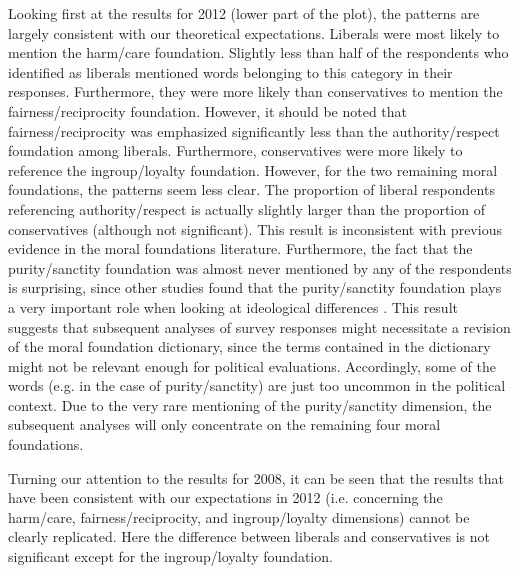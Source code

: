 \documentclass[12pt]{article}
\begin{document}
Looking first at the results for 2012 (lower part of the plot), the patterns are largely consistent with our theoretical expectations. Liberals were most likely to mention the harm/care foundation. Slightly less than half of the respondents who identified as liberals mentioned words belonging to this category in their responses. Furthermore, they were more likely than conservatives to mention the fairness/reciprocity foundation. However, it should be noted that fairness/reciprocity was emphasized significantly less than the authority/respect foundation among liberals. Furthermore, conservatives were more likely to reference the ingroup/loyalty foundation. However, for the two remaining moral foundations, the patterns seem less clear. The proportion of liberal respondents referencing authority/respect is actually slightly larger than the proportion of conservatives (although not significant). This result is inconsistent with previous evidence in the moral foundations literature. Furthermore, the fact that the purity/sanctity foundation was almost never mentioned by any of the respondents is surprising, since other studies found that the purity/sanctity foundation plays a very important role when looking at ideological differences \citep{koleva2012tracing}. This result suggests that subsequent analyses of survey responses might necessitate a revision of the moral foundation dictionary, since the terms contained in the dictionary might not be relevant enough for political evaluations. Accordingly, some of the words (e.g. in the case of purity/sanctity) are just too uncommon in the political context. Due to the very rare mentioning of the purity/sanctity dimension, the subsequent analyses will only concentrate on the remaining four moral foundations.

Turning our attention to the results for 2008, it can be seen that the results that have been consistent with our expectations in 2012 (i.e. concerning the harm/care, fairness/reciprocity, and ingroup/loyalty dimensions) cannot be clearly replicated. Here the difference between liberals and conservatives is not significant except for the ingroup/loyalty foundation.
\end{document}
